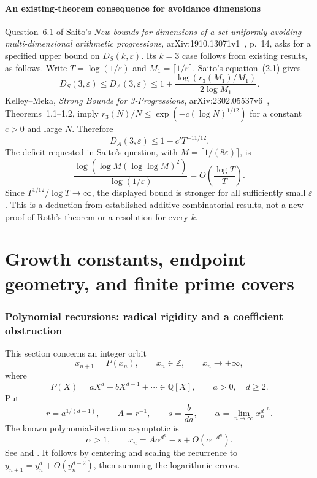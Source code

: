 \documentclass[11pt,a4paper]{article}
\theoremstyle{definition}
\theoremstyle{remark}
\numberwithin{equation}{section}
\begin{document}
\subsection{An existing-theorem consequence for avoidance dimensions}

Question~6.1 of Saito's \emph{New bounds for dimensions of a set uniformly avoiding multi-dimensional arithmetic progressions}, arXiv:1910.13071v1~\cite{SaitoAvoidance}, p.~14, asks for a specified upper bound on $D_S(k,\varepsilon)$. Its $k=3$ case follows from existing results, as follows. Write $T=\log(1/\varepsilon)$ and $M_1=\lceil1/\varepsilon\rceil$. Saito's equation~(2.1) gives
\[
 D_S(3,\varepsilon)\leq D_A(3,\varepsilon)
 \leq1+\frac{\log(r_3(M_1)/M_1)}{2\log M_1}.
\]
Kelley--Meka, \emph{Strong Bounds for 3-Progressions}, arXiv:2302.05537v6~\cite{KelleyMeka}, Theorems~1.1--1.2, imply $r_3(N)/N\leq\exp(-c(\log N)^{1/12})$ for a constant $c>0$ and large $N$. Therefore
\[
 D_A(3,\varepsilon)\leq1-c'T^{-11/12}.
\]
The deficit requested in Saito's question, with $M=\lceil1/(8\varepsilon)\rceil$, is
\[
 \frac{\log(\log M(\log\log M)^2)}{\log(1/\varepsilon)}
 =O\left(\frac{\log T}{T}\right).
\]
Since $T^{1/12}/\log T\to\infty$, the displayed bound is stronger for all sufficiently small $\varepsilon$. This is a deduction from established additive-combinatorial results, not a new proof of Roth's theorem or a resolution for every $k$.

\clearpage
\clearpage
\part{Growth constants, endpoint geometry, and finite prime covers}
\label{part:classifications}
\section{Polynomial recursions: radical rigidity and a coefficient obstruction}
\label{tw:sec:growth-new}

This section concerns an integer orbit
\begin{equation}\label{tw:eq:growth-orbit}
 x_{n+1}=P(x_n),\qquad x_n\in\mathbb Z,\qquad x_n\longrightarrow+\infty,
\end{equation}
where
\[
 P(X)=aX^d+bX^{d-1}+\cdots\in\mathbb Q[X],\qquad a>0,\quad d\ge2.
\]
Put
\[
 r=a^{1/(d-1)},\qquad A=r^{-1},\qquad s=\frac{b}{da},\qquad
 \alpha=\lim_{n\to\infty}x_n^{d^{-n}}.
\]
The known polynomial-iteration asymptotic is
\begin{equation}\label{tw:eq:growth-asymptotic}
 \alpha>1,\qquad
 x_n=A\alpha^{d^n}-s+O(\alpha^{-d^n}).
\end{equation}
See \cite[Section~2]{WagnerZiegler2021} and
\cite[equation~(1.2)]{Kumar2023}.
It follows by centering and scaling the recurrence to
$y_{n+1}=y_n^d+O(y_n^{d-2})$, then summing the logarithmic errors.
\end{document}
